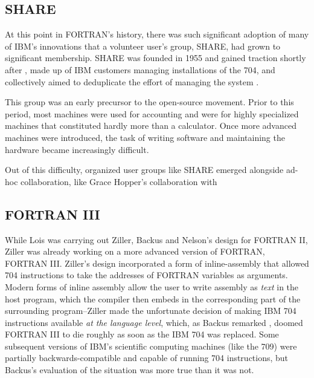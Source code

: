 \subsection{SHARE}
\label{subsec:share}

At this point in FORTRAN's history, there was such significant adoption of
many of IBM's innovations that a volunteer user's group, SHARE, had grown to
significant membership.
SHARE was founded in 1955 and gained traction shortly after \cite{akera_voluntarism_ibm_share_2001},
made up of IBM customers managing installations of the 704,
and collectively aimed to deduplicate the effort of managing the system
\cite{armer_share_eulogy_1980}.

This group was an early precursor to the open-source movement.
Prior to this period, most machines were used for accounting and were for
highly specialized machines that constituted hardly more than a calculator.
Once more advanced machines were introduced, the task of writing software
and maintaining the hardware became increasingly difficult.

Out of this difficulty, organized user groups like SHARE emerged alongside
ad-hoc collaboration, like Grace Hopper's collaboration with

\subsection{FORTRAN III}

While Lois was carrying out Ziller, Backus and Nelson's design for FORTRAN II,
Ziller was already working on a more advanced version of FORTRAN, FORTRAN III.
Ziller's design incorporated a form of \gls{inline-assembly} that allowed
704 instructions to take the addresses of FORTRAN variables as arguments.
Modern forms of inline assembly allow the user to write assembly as \textit{text}
in the host program, which the compiler then embeds in the corresponding
part of the surrounding program--Ziller made the unfortunate decision of making IBM 704
instructions available \textit{at the language level}, which, as Backus remarked
\cite{hopl_backus_history_of_fortran}, doomed FORTRAN III to die roughly as soon
as the IBM 704 was replaced. Some subsequent versions of IBM's scientific
computing machines (like the 709) were partially backwards-compatible
and capable of running 704 instructions,
but Backus's evaluation of the situation was more true than it was not.

